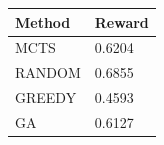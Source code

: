 \begin{tabular}{ll}
\hline
Method & Reward \\
\hline
  MCTS & 0.6204 \\
  RANDOM & 0.6855 \\
  GREEDY & 0.4593 \\
  GA & 0.6127 \\
\hline
\end{tabular}
